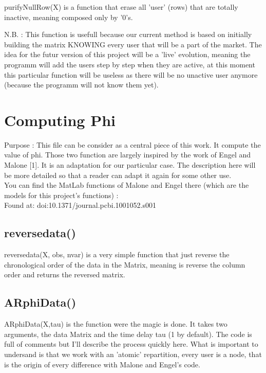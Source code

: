 \documentclass{report}
\begin{document}
purifyNullRow(X) is a function that erase all 'user' (rows) that are totally inactive, meaning composed only by '0's.

N.B. : This function is usefull because our current method is based on initially building the matrix KNOWING every user that will be a part of the market. The idea for the futur version of this project will be a 'live' evolution, meaning the programm will add the users step by step when they are active, at this moment this particular function will be useless as there will be no unactive user anymore (because the programm will not know them yet).


\section{Computing Phi}

Purpose : This file can be consider as a central piece of this work. It compute the value of phi. Those two function are largely inspired by the work of Engel and Malone [1]. It is an adaptation for our particular case. The description here will be more detailed so that a reader can adapt it again for some other use. \\

You can find the MatLab functions of Malone and Engel there (which are the models for this project's functions) : \\
Found at: doi:10.1371/journal.pcbi.1001052.s001

\subsection{reversedata()}

reversedata(X, obs, nvar) is a very simple function that just reverse the chronological order of the data in the Matrix, meaning is reverse the column order and returns the reversed matrix.

\subsection{ARphiData()}

ARphiData(X,tau) is the function were the magic is done. It takes two arguments, the data Matrix and the time delay tau (1 by default). The code is full of comments but I'll describe the process quickly here. What is important to undersand is that we work with an 'atomic' repartition, every user is a node, that is the origin of every difference with Malone and Engel's code.
\end{document}
